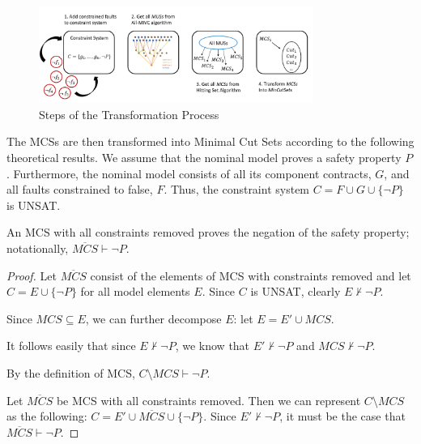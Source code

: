 \begin{figure}[htbp]
	\begin{center}
		\includegraphics[width=0.8\textwidth]{images/stepsOfTransformation.PNG}
	\end{center}
	\caption{Steps of the Transformation Process}
	\label{fig:trans}
\end{figure}

The MCSs are then transformed into Minimal Cut Sets according to the following theoretical results. We assume that the nominal model proves a safety property $P$. Furthermore, the nominal model consists of all its component contracts, $G$, and all faults constrained to false, $F$. Thus, the constraint system $C = F \cup G \cup \{\neg P\}$ is UNSAT.



\begin{lemma}
An MCS with all constraints removed proves the negation of the safety property; notationally, $\overline{MCS} \vdash \neg P$.

\begin{proof}
Let $\overline{MCS}$ consist of the elements of MCS with constraints removed and let $C = E \cup \{\neg P\}$ for all model elements $E$. Since $C$ is UNSAT, clearly $E \not \vdash \neg P$. 

Since $MCS \subseteq E$, we can further decompose $E$: let $E = E' \cup MCS$. 

It follows easily that since $E \not \vdash \neg P$, we know that $E' \not \vdash \neg P$ and $MCS \not \vdash \neg P$. 

By the definition of MCS, $C \setminus MCS \vdash \neg P$. 

Let $\overline{MCS}$ be MCS with all constraints removed. Then we can represent $C \setminus MCS$ as the following: $C = E' \cup \overline{MCS} \cup \{\neg P\}$. 
Since $E' \not \vdash \neg P$, it must be the case that $\overline{MCS} \vdash \neg P$.

\end{proof}
\label{lem:minCorrSet1}
\end{lemma}

